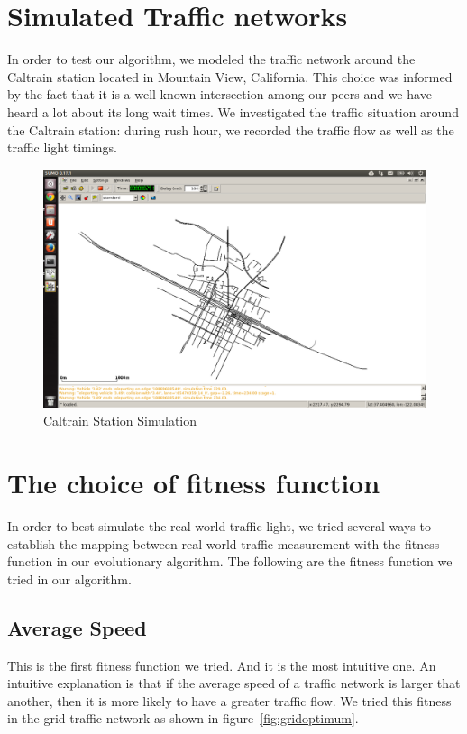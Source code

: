 \documentclass{article} %
\begin{document}
\section{Simulated Traffic networks}
In order to test our algorithm, we modeled the traffic network around the Caltrain station located in Mountain View, California. This choice was informed by the fact that it is a well-known intersection among our peers and we have heard a lot about its long wait times. We investigated the traffic situation around the Caltrain station: during rush hour, we recorded the traffic flow as well as the traffic light timings.
\begin{figure}
\caption{Caltrain Station Simulation}
\includegraphics[width=\textwidth]{images/simulator/caltrain.png}
\end{figure}


\section{The choice of fitness function}
In order to best simulate the real world traffic light, we tried several ways to establish the mapping between real world traffic measurement with the fitness function in our evolutionary algorithm. The following are the fitness function we tried in our algorithm.
\subsection{Average Speed}
This is the first fitness function we tried. And it is the most intuitive one. An intuitive explanation is that if the average speed of a traffic network is larger that another, then it is more likely to have a greater traffic flow. We tried this fitness in the grid traffic network as shown in figure~\ref{fig:gridoptimum}.
\end{document}
